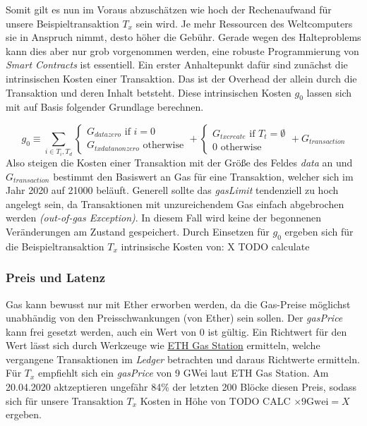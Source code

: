 \documentclass[runningheads]{llncs}
\begin{document}
Somit gilt es nun im Voraus abzuschätzen wie hoch der Rechenaufwand für unsere Beispieltransaktion $ T_x $ sein wird. Je mehr Ressourcen des Weltcomputers sie in Anspruch nimmt, desto höher die Gebühr. Gerade wegen des Halteproblems kann dies aber nur grob vorgenommen werden, eine robuste Programmierung von \textit{Smart Contracts} ist essentiell. Ein erster Anhaltepunkt dafür sind zunächst die intrinsischen Kosten einer Transaktion. Das ist der Overhead der allein durch die Transaktion und deren Inhalt betsteht. Diese intrinsischen Kosten $ g_0 $ lassen sich mit auf Basis folgender Grundlage berechnen.

$$ g_0 \equiv \sum_{i \in T_i, T_d}
  \begin{cases}
    G_{datazero} \text{ if } i=0 \\
    G_{txdatanonzero} \text{ otherwise}
  \end{cases}
  +
  \begin{cases}
    G_{txcreate} \text{ if } T_t = \emptyset \\
    0 \text{ otherwise}
  \end{cases}
  +
  G_{transaction}
$$
Also steigen die Kosten einer Transaktion mit der Größe des Feldes \textit{data} an und $ G_{transaction} $ bestimmt den Basiswert an Gas für eine Transaktion, welcher sich im Jahr 2020 auf 21000 beläuft. Generell sollte das \textit{gasLimit} tendenziell zu hoch angelegt sein, da Transaktionen mit unzureichendem Gas einfach abgebrochen werden \textit{(out-of-gas Exception)}. In diesem Fall wird keine der begonnenen Veränderungen am Zustand gespeichert. Durch Einsetzen für $ g_0 $ ergeben sich für die Beispieltransaktion $ T_x $ intrinsische Kosten von:  X TODO calculate

\subsubsection{Preis und Latenz}
Gas kann bewusst nur mit Ether erworben werden, da die Gas-Preise möglichst unabhändig von den Preisschwankungen (von Ether) sein sollen. Der \textit{gasPrice} kann frei gesetzt werden, auch ein Wert von 0 ist gültig. Ein Richtwert für den Wert lässt sich durch Werkzeuge wie \href{https://www.ethgasstation.info/}{ETH Gas Station} ermitteln, welche vergangene Transaktionen im \textit{Ledger} betrachten und daraus Richtwerte ermitteln. Für $ T_x $ empfiehlt sich ein \textit{gasPrice} von 9 GWei laut ETH Gas Station. Am 20.04.2020 aktzeptieren  ungefähr 84\% der letzten 200 Blöcke diesen Preis, sodass sich für unsere Transaktion $ T_x $ Kosten in Höhe von TODO CALC $ \times 9\text{Gwei} = X $ ergeben.
\end{document}
